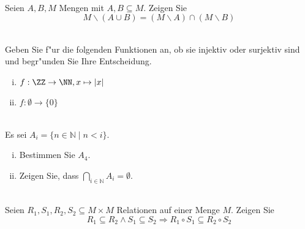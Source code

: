 \newcommand{\printpraesenzlsg}{false}
\newcommand{\printloesungen}{false}
\newcommand{\printbewertungen}{false}
\newcommand{\blattnummer}{1}



\iforiginal{}

	


\\
Seien $A,B,M$ Mengen mit $A,B\subseteq M$. Zeigen Sie \[M\backslash (A\cup B) = (M\backslash A)\cap (M\backslash B)\]

\\
Geben Sie f"ur die folgenden Funktionen an, ob sie injektiv oder surjektiv sind und begr"unden Sie Ihre Entscheidung.\\

\begin{enumerate}[(i)]
\item $f:\ZZ\to\NN, x\mapsto |x|$
\item $f:\emptyset\to\{0\}$
\end{enumerate}

\\
Es sei $A_i=\{n\in\mathbb{N}\mid n<i\}$.
\begin{enumerate}[(i)]
    \item Bestimmen Sie $A_4$.
    \item Zeigen Sie, dass $\bigcap_{i\in\mathbb{N}}A_i=\emptyset$.
\end{enumerate}

\\
Seien $R_1,S_1,R_2,S_2\subseteq M\times M$ Relationen auf einer Menge $M$. Zeigen Sie \[R_1\subseteq R_2\wedge S_1\subseteq S_2\Rightarrow R_1\circ S_1\subseteq R_2\circ S_2\]

